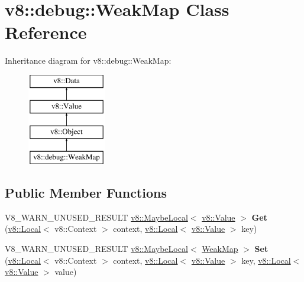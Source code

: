 \hypertarget{classv8_1_1debug_1_1WeakMap}{}\section{v8\+:\+:debug\+:\+:Weak\+Map Class Reference}
\label{classv8_1_1debug_1_1WeakMap}
Inheritance diagram for v8\+:\+:debug\+:\+:Weak\+Map\+:\begin{figure}[H]
\begin{center}
\leavevmode
\includegraphics[height=4.000000cm]{classv8_1_1debug_1_1WeakMap}
\end{center}
\end{figure}
\subsection*{Public Member Functions}
\begin{DoxyCompactItemize}
\item 
\mbox{\label{classv8_1_1debug_1_1WeakMap_ad151f61f73b3cb4b5c2c971066d0d4fd}} 
V8\+\_\+\+W\+A\+R\+N\+\_\+\+U\+N\+U\+S\+E\+D\+\_\+\+R\+E\+S\+U\+LT \mbox{\hyperlink{classv8_1_1MaybeLocal}{v8\+::\+Maybe\+Local}}$<$ \mbox{\hyperlink{classv8_1_1Value}{v8\+::\+Value}} $>$ {\bfseries Get} (\mbox{\hyperlink{classv8_1_1Local}{v8\+::\+Local}}$<$ v8\+::\+Context $>$ context, \mbox{\hyperlink{classv8_1_1Local}{v8\+::\+Local}}$<$ \mbox{\hyperlink{classv8_1_1Value}{v8\+::\+Value}} $>$ key)
\item 
\mbox{\label{classv8_1_1debug_1_1WeakMap_a60755ef0a455cb6b99cea7f62afb4ba8}} 
V8\+\_\+\+W\+A\+R\+N\+\_\+\+U\+N\+U\+S\+E\+D\+\_\+\+R\+E\+S\+U\+LT \mbox{\hyperlink{classv8_1_1MaybeLocal}{v8\+::\+Maybe\+Local}}$<$ \mbox{\hyperlink{classv8_1_1debug_1_1WeakMap}{Weak\+Map}} $>$ {\bfseries Set} (\mbox{\hyperlink{classv8_1_1Local}{v8\+::\+Local}}$<$ v8\+::\+Context $>$ context, \mbox{\hyperlink{classv8_1_1Local}{v8\+::\+Local}}$<$ \mbox{\hyperlink{classv8_1_1Value}{v8\+::\+Value}} $>$ key, \mbox{\hyperlink{classv8_1_1Local}{v8\+::\+Local}}$<$ \mbox{\hyperlink{classv8_1_1Value}{v8\+::\+Value}} $>$ value)
\end{DoxyCompactItemize}

